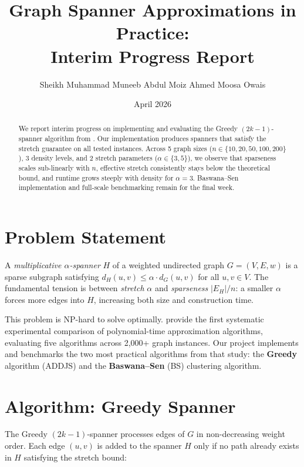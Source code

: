 \documentclass[11pt,letterpaper,twocolumn]{article}
\title{\textbf{Graph Spanner Approximations in Practice:\\
Interim Progress Report}}
\author[1]{Sheikh Muhammad Muneeb \quad Abdul Moiz Ahmed \quad Moosa Owais}
\affil[1]{Habib University, Karachi \quad
\small\texttt{\{ms08914, aa08811, mo08952\}@st.habib.edu.pk}}
\date{April 2026}
\begin{document}
\maketitle

\begin{abstract}
We report interim progress on implementing and evaluating the Greedy
$(2k{-}1)$-spanner algorithm from \citet{chimani2022spanner}.
Our implementation produces spanners that satisfy the stretch
guarantee on all tested instances.
Across 5 graph sizes ($n \in \{10, 20, 50, 100, 200\}$),
3 density levels, and 2 stretch parameters ($\alpha \in \{3, 5\}$),
we observe that sparseness scales sub-linearly with $n$,
effective stretch consistently stays below the theoretical bound,
and runtime grows steeply with density for $\alpha=3$.
Baswana--Sen implementation and full-scale benchmarking remain for
the final week.
\end{abstract}

\section{Problem Statement}

A \emph{multiplicative $\alpha$-spanner} $H$ of a weighted undirected
graph $G=(V,E,w)$ is a sparse subgraph satisfying
$d_H(u,v) \leq \alpha \cdot d_G(u,v)$ for all $u,v \in V$.
The fundamental tension is between \emph{stretch} $\alpha$ and
\emph{sparseness} $|E_H|/n$: a smaller $\alpha$ forces more edges into $H$,
increasing both size and construction time.

This problem is NP-hard to solve optimally.
\citet{chimani2022spanner} provide the first systematic experimental
comparison of polynomial-time approximation algorithms, evaluating five
algorithms across 2,000+ graph instances.
Our project implements and benchmarks the two most practical algorithms
from that study: the \textbf{Greedy} algorithm (ADDJS) and the
\textbf{Baswana--Sen} (BS) clustering algorithm.

\section{Algorithm: Greedy Spanner}

The Greedy $(2k{-}1)$-spanner processes edges of $G$ in non-decreasing
weight order.
Each edge $(u,v)$ is added to the spanner $H$ only if no path
already exists in $H$ satisfying the stretch bound:
\end{document}
